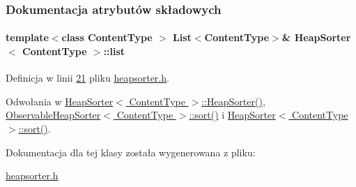 \subsubsection{Dokumentacja atrybutów składowych}
\hypertarget{class_heap_sorter_ae5061b641a597893a2e7f747c9cc15f2}{
\paragraph[{list}]{\setlength{\rightskip}{0pt plus 5cm}template$<$class Content\-Type $>$ {\bf List}$<$Content\-Type$>$\& {\bf Heap\-Sorter}$<$ Content\-Type $>$\-::list}}\label{class_heap_sorter_ae5061b641a597893a2e7f747c9cc15f2}


Definicja w linii \hyperlink{heapsorter_8h_source_l00021}{21} pliku \hyperlink{heapsorter_8h_source}{heapsorter.\-h}.



Odwołania w \hyperlink{heapsorter_8h_source_l00026}{Heap\-Sorter$<$ Content\-Type $>$\-::\-Heap\-Sorter()}, \hyperlink{observableheapsorter_8h_source_l00026}{Observable\-Heap\-Sorter$<$ Content\-Type $>$\-::sort()} i \hyperlink{heapsorter_8h_source_l00042}{Heap\-Sorter$<$ Content\-Type $>$\-::sort()}.



Dokumentacja dla tej klasy została wygenerowana z pliku\-:\begin{DoxyCompactItemize}
\item 
\hyperlink{heapsorter_8h}{heapsorter.\-h}\end{DoxyCompactItemize}
